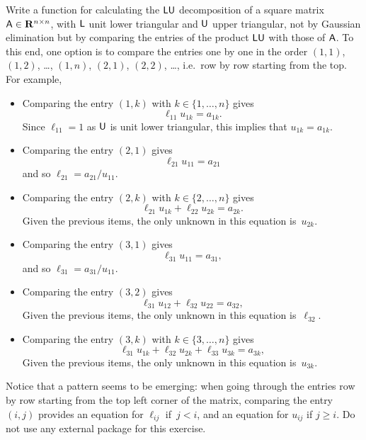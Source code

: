 \begin{exercise}
    Write a function  for calculating the $\mathsf L \mathsf U$ decomposition of a square matrix $\mathsf A \in \mathbf R^{n \times n}$,
    with $\mathsf L$ unit lower triangular and $\mathsf U$ upper triangular,
    not by Gaussian elimination but by comparing the entries of the product $\mathsf L \mathsf U$ with those of $\mathsf A$.
    To this end, one option is to compare the entries one by one
    in the order $(1, 1)$, $(1, 2)$, \dots, $(1, n)$, $(2, 1)$, $(2, 2)$, \dots,
    i.e.\ row by row starting from the top.
    For example,
    \begin{itemize}
        \item
            Comparing the entry $(1, k)$ with $k \in \{1, \dotsc, n\}$ gives
            \[
                \ell_{11} u_{1k} = a_{1k}.
            \]
            Since $\ell_{11} = 1$ as $\mathsf U$ is unit lower triangular,
            this implies that $u_{1k} = a_{1k}$.

        \item
            Comparing the entry $(2, 1)$ gives
            \[
                \ell_{21} u_{11} = a_{21}
            \]
            and so $\ell_{21} = a_{21} / u_{11}$.

        \item
            Comparing the entry $(2, k)$ with $k \in \{2, \dotsc, n\}$ gives
            \[
                \ell_{21} u_{1k} + \ell_{22} u_{2k} = a_{2k}.
            \]
            Given the previous items,
            the only unknown in this equation is~$u_{2k}$.

        \item
            Comparing the entry $(3, 1)$ gives
            \[
                \ell_{31} u_{11} = a_{31},
            \]
            and so $\ell_{31} = a_{31} / u_{11}$.

        \item
            Comparing the entry $(3, 2)$ gives
            \[
                \ell_{31} u_{12} + \ell_{32} u_{22} = a_{32},
            \]
            Given the previous items,
            the only unknown in this equation is~$\ell_{32}$.

        \item
            Comparing the entry $(3, k)$ with $k \in \{3, \dotsc, n\}$ gives
            \[
                \ell_{31} u_{1k} + \ell_{32} u_{2k} + \ell_{33} u_{3k} = a_{3k},
            \]
            Given the previous items,
            the only unknown in this equation is~$u_{3k}$.
    \end{itemize}
    Notice that a pattern seems to be emerging:
    when going through the entries row by row starting from the top left corner of the matrix,
    comparing the entry $(i, j)$ provides an equation for $\ell_{ij}$ if~$j < i$,
    and an equation for $u_{ij}$ if $j \geq i$.
    Do not use any external package for this exercise.


\end{exercise}
